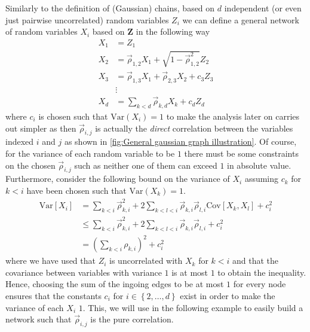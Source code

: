 \documentclass[../Thesis.tex]{subfiles}
\begin{document}
Similarly to the definition of (Gaussian) chains, based on $d$ independent (or even just pairwise uncorrelated) random variables $Z_i$ we can define a general network of random variables $X_i$ based on $\boldsymbol Z$ in the following way
\begin{equation}\label{eq:Gaussian network in terms of Z}
    \begin{split}
        X_1 & = Z_1                                                      \\
        X_2 & = \vec{\rho}_{1,2} X_1 + \sqrt{1 - \vec{\rho}_{1,2}^2} Z_2 \\
        X_3 & = \vec{\rho}_{1,3} X_1 + \vec{\rho}_{2,3} X_2 + c_3 Z_3    \\
            & \vdots                                                     \\
        X_d & = \sum_{k < d} \vec{\rho}_{k,d} X_k + c_d Z_d
    \end{split}
\end{equation}
where $c_i$ is chosen such that $\text{Var}\left(X_i\right) = 1$ to make the analysis later on carries out simpler as then $\vec{\rho}_{i,j}$ is actually the \textit{direct} correlation between the variables indexed $i$ and $j$ as shown in \autoref{fig:General gaussian graph illustration}. Of course, for the variance of each random variable to be $1$ there must be some constraints on the chosen $\vec{\rho}_{i,j}$ such as neither one of them can exceed $1$ in absolute value. Furthermore, consider the following bound on the variance of $X_i$ assuming $c_k$ for $k < i$ have been chosen such that $\text{Var}\left(X_k\right) = 1$.
\begin{equation}\label{eq:bound on variance for network variable from the sum of ingoing weights}
    \begin{aligned}
        \text{Var}\left[X_i\right] & = \sum_{k < i} \vec{\rho}_{k,i}^2 + 2\sum_{k < l < i} \vec{\rho}_{k,i} \vec{\rho}_{l,i} \text{Cov} \left[X_k,X_l\right] + c_i^2 \\
                               & \leq  \sum_{k < i} \vec{\rho}_{k,i}^2 + 2\sum_{k < l < i} \vec{\rho}_{k,i} \vec{\rho}_{l,i} + c_i^2                             \\
                               & = \left(\sum_{k < i} \rho_{k,i}\right)^2 + c_i^2
    \end{aligned}
\end{equation}
where we have used that $Z_i$ is uncorrelated with $X_k$ for $k < i$ and that the covariance between variables with variance $1$ is at most $1$ to obtain the inequality. Hence, choosing the sum of the ingoing edges to be at most $1$ for every node ensures that the constants $c_i$ for $i\in\left\{2,\dots, d\right\}$ exist in order to make the variance of each $X_i$ $1$. This, we will use in the following example to easily build a network such that $\vec{\rho}_{i,j}$ is the pure correlation.
\end{document}
